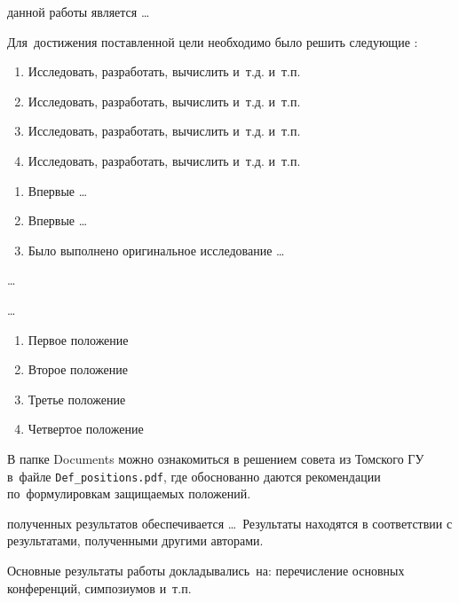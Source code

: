 
{\aim} данной работы является \ldots

Для~достижения поставленной цели необходимо было решить следующие {\tasks}:
\begin{enumerate}[beginpenalty=10000] %
  \item Исследовать, разработать, вычислить и~т.\:д. и~т.\:п.
  \item Исследовать, разработать, вычислить и~т.\:д. и~т.\:п.
  \item Исследовать, разработать, вычислить и~т.\:д. и~т.\:п.
  \item Исследовать, разработать, вычислить и~т.\:д. и~т.\:п.
\end{enumerate}


{\novelty}
\begin{enumerate}[beginpenalty=10000] %
  \item Впервые \ldots
  \item Впервые \ldots
  \item Было выполнено оригинальное исследование \ldots
\end{enumerate}

{\influence} \ldots

{\methods} \ldots

{}
\begin{enumerate}[beginpenalty=10000] %
  \item Первое положение
  \item Второе положение
  \item Третье положение
  \item Четвертое положение
\end{enumerate}
В папке Documents можно ознакомиться в решением совета из Томского ГУ
в~файле \verb+Def_positions.pdf+, где обоснованно даются рекомендации
по~формулировкам защищаемых положений.

{\reliability} полученных результатов обеспечивается \ldots \ Результаты находятся в соответствии с результатами, полученными другими авторами.


{\probation}
Основные результаты работы докладывались~на:
перечисление основных конференций, симпозиумов и~т.\:п.

